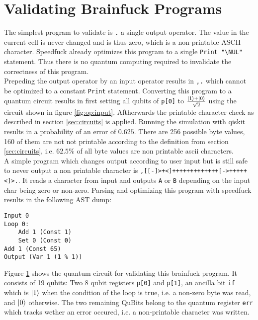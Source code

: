 \documentclass[11pt, a4paper]{article}
\DeclarePairedDelimiter\ket{\lvert}{\rangle}
\begin{document}
\section{Validating Brainfuck Programs} \label{sec:experiments}
The simplest program to validate is \verb'.' a single output operator. The value in the current cell is never changed and is thus zero, which is a non-printable ASCII character. Speedfuck already optimizes this program to a single \verb'Print "\NUL"' statement. Thus there is no quantum computing required to invalidate the correctness of this program. \\
Prepeding the output operator by an input operator results in \verb',.' which cannot be optimized to a constant \verb'Print' statement. Converting this program to a quantum circuit results in first setting all qubits of \verb'p[0]' to $\frac{\ket{1} + \ket{0}}{\sqrt{2}}$ using the circuit shown in figure \ref{fig:op:input}. Aftherwards the printable character check as described in section \ref{sec:circuits} is applied. Running the simulation with qiskit results in a probability of an error of $0.625$. There are 256 possible byte values, 160 of them are not not printable according to the definition from section \ref{sec:circuits}, i.e. $62.5\%$ of all byte values are non printable ascii characters. \\
A simple program which changes output according to user input but is still safe to never output a non printable character is \verb',[[-]>+<]+++++++++++++[->+++++<]>.'. It reads a character from input and outputs \verb'A' or \verb'B' depending on the input char being zero or non-zero. Parsing and optimizing this program with speedfuck results in the following AST dump:
\begin{lstlisting}
Input 0
Loop 0:
	Add 1 (Const 1)
	Set 0 (Const 0)
Add 1 (Const 65)
Output (Var 1 (1 % 1))
\end{lstlisting}

Figure \ref{fig:simplesafe} shows the quantum circuit for validating this brainfuck program. It consists of 19 qubits: Two 8 qubit registers \verb'p[0]' and \verb'p[1]', an ancilla bit \verb'if' which is $\ket{1}$ when the condition of the loop is true, i.e. a non-zero byte was read, and $\ket{0}$ otherwise. The two remaining QuBits belong to the quantum register \verb'err' which tracks wether an error occured, i.e. a non-printable character was written.

\begin{figure}[H]
	\centering
	
	\caption{}
	\label{fig:simplesafe}
\end{figure}
\end{document}
